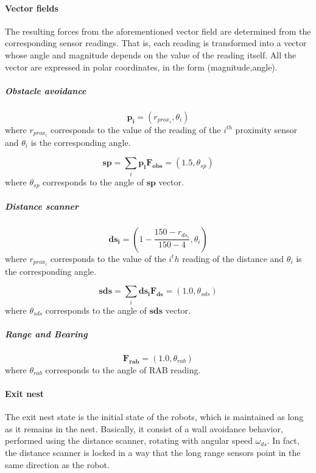 \paragraph{Vector fields}
The resulting forces from the aforementioned vector field are determined from the corresponding sensor readings.
That is, each reading is transformed into a vector whose angle and magnitude depends on the value of the reading itself.
All the vector are expressed in polar coordinates, in the form (magnitude,angle).

\subparagraph{Obstacle avoidance}
\begin{equation}
\mathbf{p_i} = (r_{prox_{i}},\theta_i)  
\end{equation}
where $r_{prox_i}$ corresponds to the value of the reading of the $i^{th}$ proximity sensor and $\theta_i$ is the corresponding angle.

\begin{equation}
\mathbf{sp} = \sum_i \mathbf{p_i}  
\mathbf{F_{obs}} = (1.5,\theta_{sp})  
\end{equation}
where $\theta_{sp}$ corresponds to the angle of $\mathbf{sp}$ vector.

\subparagraph{Distance scanner}
\begin{equation}
\mathbf{ds_i} = (1 - \frac{150 - r_{ds_{i}}}{150-4},\theta_i)  
\end{equation}
where $r_{prox_i}$ corresponds to the value of the $i^th$ reading of the distance and $\theta_i$ is the corresponding angle.

\begin{equation}
\mathbf{sds} = \sum_i \mathbf{ds_i}  
\mathbf{F_{ds}} = (1.0,\theta_{sds})  
\end{equation}
where $\theta_{sds}$ corresponds to the angle of $\mathbf{sds}$ vector.

\subparagraph{Range and Bearing}
\begin{equation}
\mathbf{F_{rab}} = (1.0,\theta_{rab})  
\end{equation}
where $\theta_{rab}$ corresponds to the angle of RAB reading.

\paragraph{Exit nest}
The exit nest state is the initial state of the robots, which is maintained as long as it remains in the nest.
Basically, it consist of a wall avoidance behavior, performed using the distance scanner, rotating with angular speed $\omega_{ds}$.
In fact, the distance scanner is locked in a way that the long range sensors point in the same direction as the robot.

